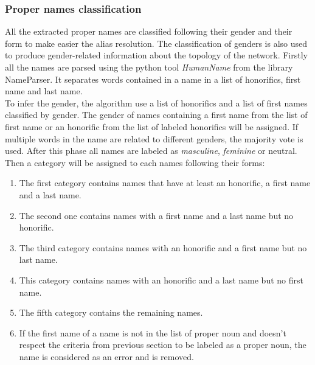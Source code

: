 \documentclass[a4paper, 12pt]{report}
\begin{document}
\subsubsection{Proper names classification}
\label{section:classification}
All the extracted proper names are classified following their gender and their form to make easier the alias resolution. 
The classification of genders is also used to produce gender-related information about the topology of the network.
Firstly all the names are parsed using the python tool \textit{HumanName} from the library {NameParser}. 
It separates words contained in a name in a list of honorifics, first name and last name.\\

To infer the gender, the algorithm use a list of honorifics and a list of first names classified by gender. 
The gender of names containing a first name from the list of first name or an honorific from the list of  labeled honorifics will be assigned. 
If multiple words in the name are related to different genders, the majority vote is used. 
After this phase all names are labeled as \textit{masculine}, \textit{feminine} or {neutral}.\\

Then a category will be assigned to each names following their forms:
\begin{enumerate}
	\item The first category contains names that have at least an honorific, a first name and a last name.
	\item The second one contains names with a first name and a last name but no honorific.
	\item The third category contains names with an honorific and a first name but no last name.
	\item This category contains names with an honorific and a last name but no first name.
	\item The fifth category contains the remaining names.
	 \item If the first name of a name is not in the list of proper noun and doesn't respect the criteria from previous section to be labeled as a proper noun, 
	 the name is considered as an error and is removed.
\end{enumerate}
\end{document}
